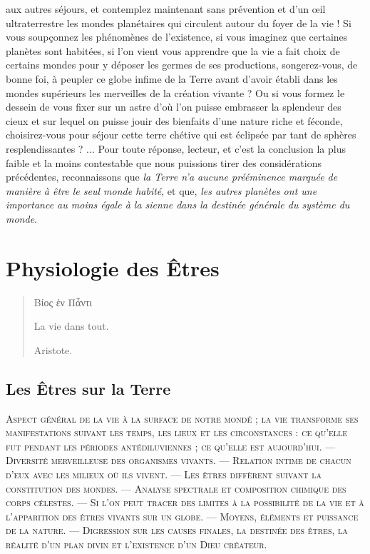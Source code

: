\documentclass[a4paper, 11pt, oneside]{article}
\begin{document}
aux autres séjours, et contemplez maintenant sans prévention et d'un œil ultraterrestre les mondes planétaires qui circulent autour du foyer de la vie ! Si vous soupçonnez les phénomènes de l'existence, si vous imaginez que certaines planètes sont habitées, si l'on vient vous apprendre que la vie a fait choix de certains mondes pour y déposer les germes de ses productions, songerez-vous, de bonne foi, à peupler ce globe infime de la Terre avant d'avoir établi dans les mondes supérieurs les merveilles de la création vivante ? Ou si vous formez le dessein de vous fixer sur un astre d'où l'on puisse embrasser la splendeur des cieux et sur lequel on puisse jouir des bienfaits d'une nature riche et féconde, choisirez-vous pour séjour cette terre chétive qui est éclipsée par tant de sphères resplendissantes ? ... Pour toute réponse, lecteur, et c'est la conclusion la plus faible et la moins contestable que nous puissions tirer des considérations précédentes, reconnaissons que \emph{la Terre n'a aucune prééminence marquée de manière à être le seul monde habité}, et que, \emph{les autres planètes ont une importance au moins égale à la sienne dans la destinée générale du système du monde}.
\clearpage
\section{Physiologie des Êtres}
\begin{quotation}
Βίος ἑν Πἆντι

La vie dans tout.

\hspace*{5mm}Aristote.
\end{quotation}

\bigskip

\subsection{Les Êtres sur la Terre}
\begin{center}
\scshape
\small
Aspect général de la vie à la surface de notre mondé ; la vie transforme ses manifestations suivant les temps, les lieux et les circonstances : ce qu'elle fut pendant les périodes antédiluviennes ; ce qu'elle est aujourd'hui. --- Diversité merveilleuse des organismes vivants. --- Relation intime de chacun d'eux avec les milieux où ils vivent. --- Les êtres diffèrent suivant la constitution des mondes. --- Analyse spectrale et composition chimique des corps célestes. --- Si l'on peut tracer des limites à la possibilité de la vie et à l'apparition des êtres vivants sur un globe. --- Moyens, éléments et puissance de la nature. --- Digression sur les causes finales, la destinée des êtres, la réalité d'un plan divin et l'existence d'un Dieu créateur.
\end{center}
\end{document}
